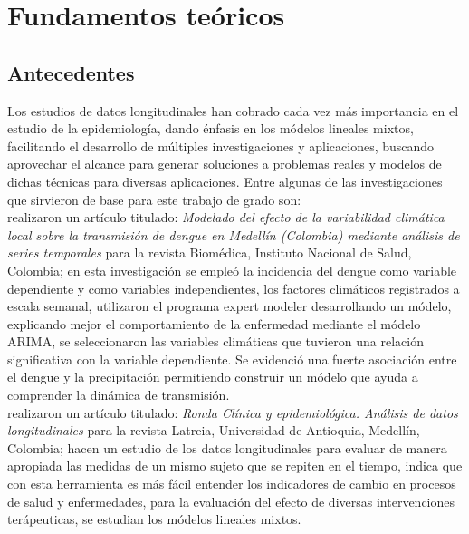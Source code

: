\chapter{Fundamentos te\'oricos}

\section{Antecedentes}

	Los estudios de datos longitudinales han cobrado cada vez m\'as importancia en el estudio de la epidemiolog\'ia, dando \'enfasis en los m\'odelos lineales mixtos, facilitando el desarrollo de m\'ultiples investigaciones y aplicaciones, buscando aprovechar el alcance para generar soluciones a problemas reales y modelos de dichas t\'ecnicas para diversas aplicaciones. Entre algunas de las investigaciones que sirvieron de base para este trabajo de grado son:\\

\textit{\citet{dengue}} realizaron un art\'iculo titulado: \textit{Modelado del efecto de la variabilidad clim\'atica local sobre la transmisi\'on de dengue en Medell\'in (Colombia) mediante an\'alisis de series temporales} para la revista Biom\'edica, Instituto Nacional de Salud, Colombia; en esta investigaci\'on se emple\'o la incidencia del dengue como variable dependiente y como variables independientes, los factores clim\'aticos registrados a escala semanal, utilizaron el programa expert modeler desarrollando un m\'odelo, explicando mejor el comportamiento de la enfermedad mediante el m\'odelo ARIMA, se seleccionaron las variables clim\'aticas que tuvieron una relaci\'on significativa con la variable dependiente. Se evidenci\'o una fuerte asociaci\'on entre el dengue y la precipitaci\'on permitiendo construir un m\'odelo que ayuda a comprender la din\'amica de transmisi\'on.  \\

\citet{latreia} realizaron un art\'iculo titulado: \textit{Ronda Cl\'inica y epidemiol\'ogica. An\'alisis de datos longitudinales} para la revista Latreia, Universidad de Antioquia, Medell\'in, Colombia; hacen un estudio de los datos longitudinales para evaluar de manera apropiada las medidas de un mismo sujeto que se repiten en el tiempo, indica que con esta herramienta es m\'as f\'acil entender los indicadores de cambio en procesos de salud y enfermedades, para la evaluaci\'on del efecto de diversas intervenciones ter\'apeuticas, se estudian los m\'odelos lineales mixtos.\\

